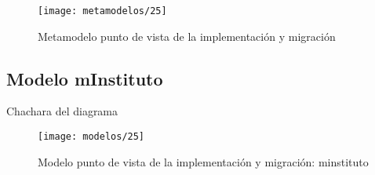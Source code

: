   \begin{figure}[H]
	\centering
	\texttt{[image: metamodelos/25]}
	\captionsetup{width=.95\textwidth}
	\caption{Metamodelo punto de vista de la implementación y migración}
	\label{metamodelo25}
  \end{figure}

  \subsection{Modelo mInstituto}Chachara del diagrama
  \begin{figure}[H]
	\centering
	\texttt{[image: modelos/25]}
	\captionsetup{width=.95\textwidth}
	\caption{Modelo punto de vista de la implementación y migración: minstituto}
	\label{modelo25}
  \end{figure}